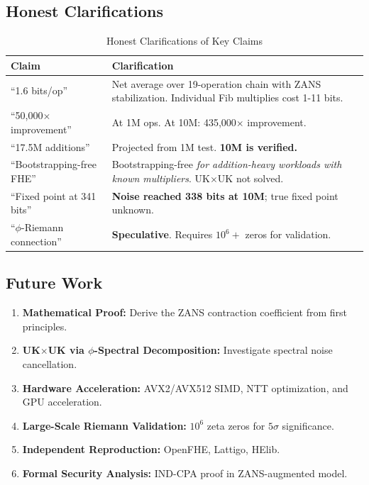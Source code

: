 \documentclass[11pt]{article}
\begin{document}
\subsection{Honest Clarifications}

\begin{table}[h]
\centering
\caption{Honest Clarifications of Key Claims}
\begin{tabular}{p{5cm}|p{8cm}}
\textbf{Claim} & \textbf{Clarification} \\
\hline
``1.6 bits/op'' & Net average over 19-operation chain with ZANS stabilization. Individual Fib multiplies cost 1-11 bits. \\
``50,000$\times$ improvement'' & At 1M ops. At 10M: 435,000$\times$ improvement. \\
``17.5M additions'' & Projected from 1M test. \textbf{10M is verified.} \\
``Bootstrapping-free FHE'' & Bootstrapping-free \textit{for addition-heavy workloads with known multipliers}. UK$\times$UK not solved. \\
``Fixed point at 341 bits'' & \textbf{Noise reached 338 bits at 10M}; true fixed point unknown. \\
``$\phi$-Riemann connection'' & \textbf{Speculative}. Requires $10^6+$ zeros for validation.
\end{tabular}
\end{table}

\subsection{Future Work}

\begin{enumerate}
    \item \textbf{Mathematical Proof:} Derive the ZANS contraction coefficient from first principles.
    \item \textbf{UK$\times$UK via $\phi$-Spectral Decomposition:} Investigate spectral noise cancellation.
    \item \textbf{Hardware Acceleration:} AVX2/AVX512 SIMD, NTT optimization, and GPU acceleration.
    \item \textbf{Large-Scale Riemann Validation:} $10^6$ zeta zeros for $5\sigma$ significance.
    \item \textbf{Independent Reproduction:} OpenFHE, Lattigo, HElib.
    \item \textbf{Formal Security Analysis:} IND-CPA proof in ZANS-augmented model.
\end{enumerate}
\end{document}
